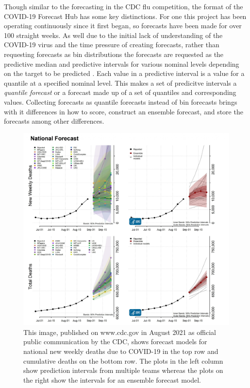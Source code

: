\documentclass[11pt,notitlepage]{isuthesis}
\begin{document}
Though similar to the forecasting in the CDC flu competition, the format of 
the COVID-19 Forecast Hub has some key distinctions. For one this project has
been operating continuously since it first began, so forecasts have been made
for over 100 straight weeks. 
As well due to the initial lack of understanding of the COVID-19 virus and the 
time 
pressure of
creating forecasts, rather than requesting forecasts as bin distributions
the forecasts are requested as the predictive median and 
predictive intervals for various nominal levels depending on the target to be
predicted \cite{bracher2021evaluating}. Each value in a predictive interval
is a value for a quantile at a specified nominal level. This makes a set of 
predicitve intervals a \emph{quantile forecast} or a forecast made up of a set
of quantiles and corresponding values.
Collecting forecasts as quantile forecasts instead of bin forecasts brings with 
it differences in how to score, construct an 
ensemble forecast, and store the forecasts among other differences.

\begin{figure}[htbp]
\begin{center}
\begin{minipage}{10cm}
\captionsetup{font=scriptsize}
\centerline{\includegraphics[scale=.12]{Images/8_30_21_cvd_deaths.jpeg}}
\caption[Official CDC COVID-19 deaths report August 2021]{This image, 
published on www.cdc.gov in August 2021 as official public communication 
by the CDC, shows forecast models for national new weekly deaths due to COVID-19 
in the top row and cumulative deaths on the bottom row. The plots in the left 
column show prediction intervals from multiple teams whereas the plots on the 
right show the intervals for an ensemble forecast model.}
\label{fig:cdcoff}
\end{minipage}
\end{center}
\end{figure}
\end{document}
